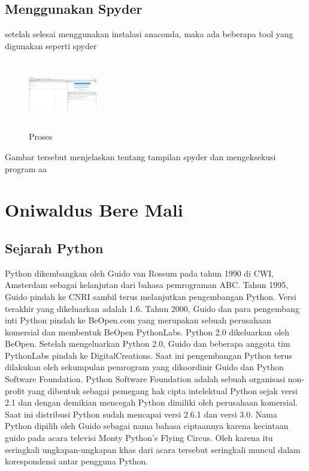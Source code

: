 \subsection{Menggunakan Spyder}
setelah selesai menggunakan instalasi anaconda,  maka ada beberapa tool yang digunakan seperti spyder
\begin{figure}[!htbp]
        \centering
        \includegraphics[width=3cm,height=3cm]{figures/felix/10.png}
        \caption{Proses}
        \label{awal}
        \end{figure}

Gambar tersebut menjelaskan tentang tampilan spyder dan mengeksekusi program aa



\section{Oniwaldus Bere Mali}
\subsection{Sejarah Python}
              Python dikembangkan oleh Guido van Rossum pada tahun 1990 di CWI, Amsterdam sebagai kelanjutan dari bahasa pemrograman ABC. Tahun 1995, Guido pindah ke CNRI sambil terus melanjutkan pengembangan Python. Versi terakhir yang dikeluarkan adalah 1.6. Tahun 2000, Guido dan para pengembang inti Python pindah ke BeOpen.com yang merupakan sebuah perusahaan komersial dan membentuk BeOpen PythonLabs. Python 2.0 dikeluarkan oleh BeOpen. Setelah mengeluarkan Python 2.0, Guido dan beberapa anggota tim PythonLabs pindah ke DigitalCreations. Saat ini pengembangan Python terus dilakukan oleh sekumpulan pemrogram yang dikoordinir Guido dan Python Software Foundation. Python Software Foundation adalah sebuah organisasi non-profit yang dibentuk sebagai pemegang hak cipta intelektual Python sejak versi 2.1 dan dengan demikian mencegah Python dimiliki oleh perusahaan komersial. Saat ini distribusi Python sudah mencapai versi 2.6.1 dan versi 3.0. Nama Python dipilih oleh Guido sebagai nama bahasa ciptaannya karena kecintaan guido pada acara televisi Monty Python's Flying Circus. Oleh karena itu seringkali ungkapan-ungkapan khas dari acara tersebut seringkali muncul dalam korespondensi antar pengguna Python. 

